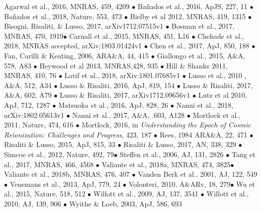 \footnotesize
Agarwal et al., 2016, MNRAS, 459, 4209 $\bullet$ 
Ba\~{n}ados et al., 2016, ApJS, 227, 11 $\bullet$
Ba\~{n}ados et al., 2018, Nature, 553, 473 $\bullet$ 
Bielby et al 2012, MNRAS, 419, 1315 $\bullet$ 
Bisogni, Risaliti, \& Lusso, 2017, arXiv1712.07515v1 $\bullet$ 
Bosman et al., 2017, MNRAS, 470, 1919$\bullet$
Carnall et al., 2015, MNRAS, 451, L16 $\bullet$ 
Chehade et al., 2018, MNRAS accepted, arXiv:1803.01424v1  $\bullet$ 
Chen et al., 2017, ApJ, 850, 188 $\bullet$
Fan, Carilli \& Keating, 2006, ARA\&A, 44, 415 $\bullet$
Giallongo et al., 2015, A\&A, 578, A83 $\bullet$ 
Heywood et al 2013, MNRAS,428, 935  $\bullet$ 
Hill \& Shanks 2011, MNRAS, 410, 76  $\bullet$ 
Latif et al., 2018,   arXiv:1801.07685v1 $\bullet$
Lusso et al., 2010 , A\&A, 512, A34 $\bullet$
Lusso \& Risaliti, 2016, ApJ, 819, 154	$\bullet$
Lusso \& Risaliti, 2017, A\&A, 602, A79	$\bullet$
Lusso \& Risaliti, 2017, arXiv1712.09656v1	$\bullet$
Lutz et al 2010, ApJ, 712, 1287 $\bullet$
Matsuoka et al., 2016,  ApJ, 828, 26 $\bullet$ 
Nanni et al., 2018, arXiv:1802.05613v1  $\bullet$ 
Nanni et al., 2017, A\&A, .603, A128	$\bullet$ 
Mortlock et al., 2011, Nature, 474, 616 $\bullet$ 
Mortlock, 2016, in {\it Understanding the Epoch of Cosmic Reionization: Challenges and Progress}, 423, 187 $\bullet$
Rees, 1984 ARA\&A, 22, 471 $\bullet$
Risaliti \& Lusso, 2015, ApJ, 815, 33 $\bullet$ 
Risaliti \& Lusso, 2017, AN, 338, 329 $\bullet$
Simcoe et al., 2012, Nature, 492, 79$\bullet$
Steffen et al., 2006, AJ, 131, 2826 $\bullet$
Tang et al., 2017, MNRAS, 466, 4568 $\bullet$ 
Valiante et al., 2018a, MNRAS, 474, 3825$\bullet$
Valiante et al., 2018b, MNRAS, 476, 407 $\bullet$
Vanden Berk et al., 2001, AJ, 122, 549 $\bullet$
Venemans et al., 2013, ApJ, 779, 24 $\bullet$  
Volonteri, 2010, A\&ARv, 18, 279$\bullet$
Wu et al., 2015, Nature, 518, 512 $\bullet$
Willott et al., 2009, AJ, 137, 3541 $\bullet$
Willott et al., 2010, AJ, 139, 906 $\bullet$
Wyithe \& Loeb, 2003,  ApJ, 586, 693 

